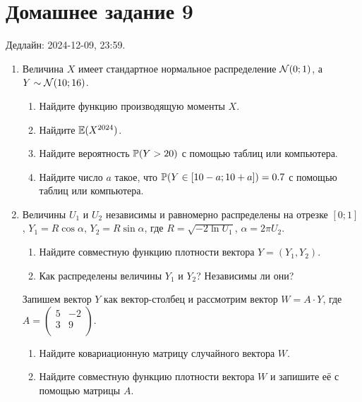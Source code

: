 \section*{Домашнее задание 9}


Дедлайн: 2024-12-09, 23:59.

\newcommand{\dBeta}{\mathrm{Beta}}

\begin{enumerate}

\item Величина $X$ имеет стандартное нормальное распределение $\cN(0;1)$, а $Y \sim \cN(10; 16)$.

\begin{enumerate}
    \item Найдите функцию производящую моменты $X$.
    \item Найдите $\E(X^{2024})$.
    \item Найдите вероятность $\P(Y > 20)$ с помощью таблиц или компьютера. 
    \item Найдите число $a$ такое, что $\P(Y \in [10 - a; 10 + a]) = 0.7$ с помощью таблиц или компьютера.
\end{enumerate}

\item Величины $U_1$ и $U_2$ независимы и равномерно распределены на отрезке $[0;1]$, $Y_1 = R \cos \alpha$, $Y_2 = R \sin \alpha$, где
$R = \sqrt{-2\ln U_1}$, $\alpha = 2\pi U_2$.

\begin{enumerate}
    \item Найдите совместную функцию плотности вектора $Y = (Y_1, Y_2)$.
    \item Как распределены величины $Y_1$ и $Y_2$? Независимы ли они?
\end{enumerate}
Запишем вектор $Y$ как вектор-столбец и рассмотрим вектор $W = A \cdot Y$, где $A = \begin{pmatrix}
    5 & -2 \\
    3 & 9 \\
\end{pmatrix}$.
\begin{enumerate}[resume]
    \item Найдите ковариационную матрицу случайного вектора $W$. 
    \item Найдите совместную функцию плотности вектора $W$ и запишите её с помощью матрицы $A$. 
\end{enumerate}


\end{enumerate}
